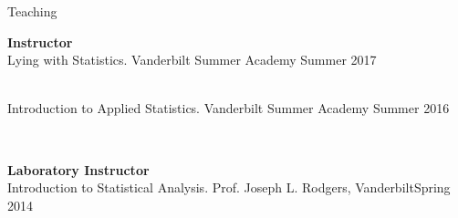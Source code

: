 \begin{rSection}{\textrm{Teaching}}
\vspace*{2pt}
\begin{minipage}{\linewidth}{\large {\bf Instructor}\\}
Lying with Statistics. Vanderbilt Summer Academy \hfill{Summer 2017}%
\begin{comment}
\begin{quote}\small ....
\end{quote}
\end{comment}
\smallskip\\
Introduction to Applied Statistics. Vanderbilt Summer Academy \hfill{Summer 2016}%
\begin{comment}\begin{quote}\small Course Description: Media stories about ``the latest scientific findings'' can range from the plausible to the silly. This class will help you learn to separate truth from  fiction by introducing you to the basic statistical methods and tools used in psychological  research. You will learn to use \R, a free and powerful statistical software package, to conduct and interpret basic scientific statistical tests. You will begin to recognize the difference between proper and improper use of data, especially the distinction between correlation and causation (\textit{e.g.}, why margarine consumption does not actually lead to more divorces in the state of Maine). For the final project, you will formulate and answer your own scientific question using these new tools and real psychology data.
\end{quote}\end{comment}
\end{minipage}
\smallskip\\
\begin{minipage}{\linewidth}{\large {\bf Laboratory Instructor}\\}
Introduction to Statistical Analysis. Prof. Joseph L. Rodgers, Vanderbilt\hfill  {Spring 2014}%

\end{minipage}
\end{rSection}
